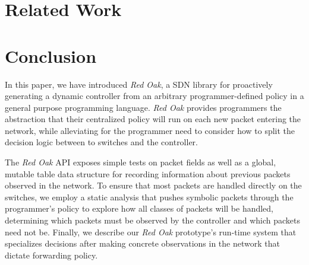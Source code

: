 \documentclass[preprint]{sigplanconf}
\begin{document}


\section*{Related Work}


\section*{Conclusion}
In this paper, we have introduced \textit{Red Oak}, a SDN library for proactively generating a dynamic controller from an arbitrary programmer-defined policy in a general purpose programming language.
\textit{Red Oak} provides programmers the abstraction that their centralized policy will run on each 
new packet entering the network, while alleviating for the programmer need to consider
how to split the decision logic between to switches and the controller.

The \textit{Red Oak} API exposes simple tests on packet fields as well as a global, mutable table data
structure for recording information about previous packets observed in the network.
To ensure that most packets are handled directly on the switches, we employ a static analysis
that pushes symbolic packets through the programmer's policy to explore how all classes of 
packets will be handled, determining which packets must be observed by the controller and which 
packets need not be. Finally, we describe our \textit{Red Oak} prototype's run-time system that 
specializes decisions after making concrete observations in the network that dictate forwarding policy.




\end{document}
